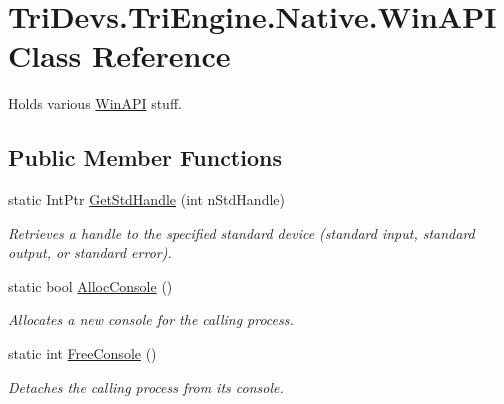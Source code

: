 \hypertarget{class_tri_devs_1_1_tri_engine_1_1_native_1_1_win_a_p_i}{\section{Tri\-Devs.\-Tri\-Engine.\-Native.\-Win\-A\-P\-I Class Reference}
\label{class_tri_devs_1_1_tri_engine_1_1_native_1_1_win_a_p_i}
}


Holds various \hyperlink{class_tri_devs_1_1_tri_engine_1_1_native_1_1_win_a_p_i}{Win\-A\-P\-I} stuff.  


\subsection*{Public Member Functions}
\begin{DoxyCompactItemize}
\item 
static Int\-Ptr \hyperlink{class_tri_devs_1_1_tri_engine_1_1_native_1_1_win_a_p_i_a10f79c8b3a9a2c4c5f7322333912cbed}{Get\-Std\-Handle} (int n\-Std\-Handle)
\begin{DoxyCompactList}\small\item\em Retrieves a handle to the specified standard device (standard input, standard output, or standard error). \end{DoxyCompactList}\item 
static bool \hyperlink{class_tri_devs_1_1_tri_engine_1_1_native_1_1_win_a_p_i_a8f3b12350e016e847f91d32521efd788}{Alloc\-Console} ()
\begin{DoxyCompactList}\small\item\em Allocates a new console for the calling process. \end{DoxyCompactList}\item 
static int \hyperlink{class_tri_devs_1_1_tri_engine_1_1_native_1_1_win_a_p_i_a50bc62149edba1db3a60f837f8b6d106}{Free\-Console} ()
\begin{DoxyCompactList}\small\item\em Detaches the calling process from its console. \end{DoxyCompactList}\end{DoxyCompactItemize}
